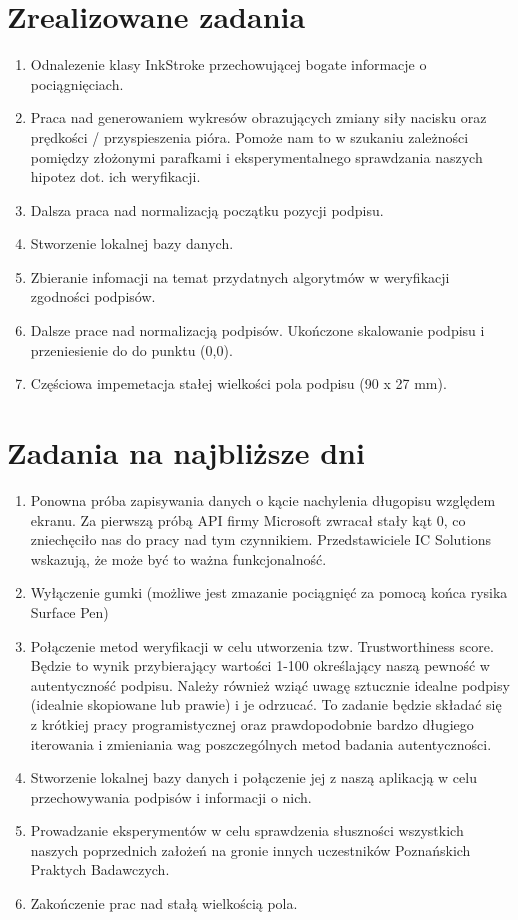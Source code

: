 \documentclass{mwrep}
\begin{document}
{\let\clearpage\relax 
\chapter{Zrealizowane zadania}}
\begin{enumerate}
	\item Odnalezenie klasy InkStroke przechowującej bogate informacje o pociągnięciach.
	\item Praca nad generowaniem wykresów obrazujących zmiany siły nacisku oraz prędkości / przyspieszenia pióra. Pomoże nam to w szukaniu zależności pomiędzy złożonymi parafkami i eksperymentalnego sprawdzania naszych hipotez dot. ich weryfikacji.
	\item Dalsza praca nad normalizacją początku pozycji podpisu.
	\item Stworzenie lokalnej bazy danych.
	\item Zbieranie infomacji na temat przydatnych algorytmów w weryfikacji zgodności podpisów. 
	\item Dalsze prace nad normalizacją podpisów. Ukończone skalowanie podpisu i przeniesienie do do punktu (0,0).
	\item Częściowa impemetacja stałej wielkości pola podpisu (90 x 27 mm).
	\end{enumerate}

{\let\clearpage\relax \chapter{Zadania na najbliższe dni}}
\begin{enumerate} 
    \item Ponowna próba zapisywania danych o kącie nachylenia długopisu względem ekranu. Za pierwszą próbą API firmy Microsoft zwracał stały kąt 0, co zniechęciło nas do pracy nad tym czynnikiem. Przedstawiciele IC Solutions wskazują, że może być to ważna funkcjonalność.
    \item Wyłączenie gumki (możliwe jest zmazanie pociągnięć za pomocą końca rysika Surface Pen)
    \item Połączenie metod weryfikacji w celu utworzenia tzw. Trustworthiness score. Będzie to wynik przybierający wartości 1-100 określający naszą pewność w autentyczność podpisu. Należy również wziąć uwagę sztucznie idealne podpisy (idealnie skopiowane lub prawie) i je odrzucać.
    To zadanie będzie składać się z krótkiej pracy programistycznej oraz prawdopodobnie bardzo długiego iterowania i zmieniania wag poszczególnych metod badania autentyczności.
    \item Stworzenie lokalnej bazy danych i połączenie jej z naszą aplikacją w celu przechowywania podpisów i informacji o nich.   
    \item Prowadzanie eksperymentów w celu sprawdzenia słuszności wszystkich naszych poprzednich założeń na gronie innych uczestników Poznańskich Praktych Badawczych.
    \item Zakończenie prac nad stałą wielkością pola.
\end{enumerate}
\end{document}
